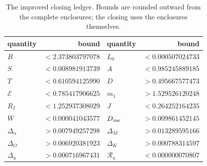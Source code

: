 \begin{table}[ht]
\centering
\caption{The improved closing ledger. Bounds are rounded outward from the
complete enclosures; the closing uses the enclosures themselves.}
\label{tab:four-routes-ledger}
\begin{tabular}{@{}lr@{\qquad}lr@{}}
\toprule
quantity & bound & quantity & bound\\
\midrule
$B$ & $<2.373803797078$ & $L_0$ & $<0.000507024733$\\
$S$ & $<0.008981913739$ & $A$ & $<0.985245889185$\\
$T$ & $<0.610594125990$ & $D$ & $>0.495667577473$\\
$\mathcal E$ & $<0.785417906625$ & $m_1$ & $>1.529526120248$\\
$R_I$ & $<1.252937308029$ & $J$ & $<0.264252164235$\\
$W$ & $<0.000041043577$ & $D_{\rm var}$ & $>0.009861452145$\\
$\Delta_\alpha$ & $>0.007949257298$ & $\Delta_M$ & $>0.013289595166$\\
$\Delta_O$ & $>0.006920381923$ & $\Delta_K$ & $>0.000788314597$\\
$\Delta_u$ & $>0.000716967431$ & $\mathcal R_u$ & $<0.000000070807$\\
\bottomrule
\end{tabular}
\end{table}
